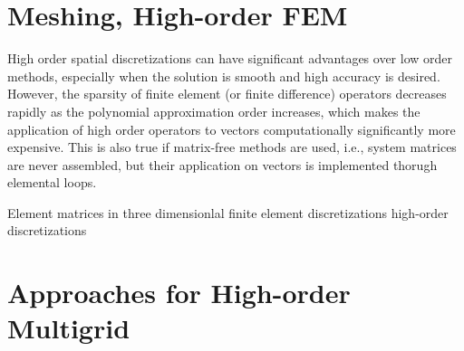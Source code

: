 \documentclass[times]{nlaauth}
\begin{document}
\section{Meshing, High-order FEM}

High order spatial discretizations can have significant advantages
over low order methods, especially when the solution is smooth and
high accuracy is desired. However, the sparsity of finite element (or
finite difference) operators decreases rapidly as the polynomial
approximation order increases, which makes the application of high
order operators to vectors computationally significantly more
expensive. This is also true if matrix-free methods are used, i.e.,
system matrices are never assembled, but their application on vectors
is implemented thorugh elemental loops.

Element matrices in three dimensionlal finite element discretizations
high-order discretizations







\section{Approaches for High-order Multigrid}
\end{document}
